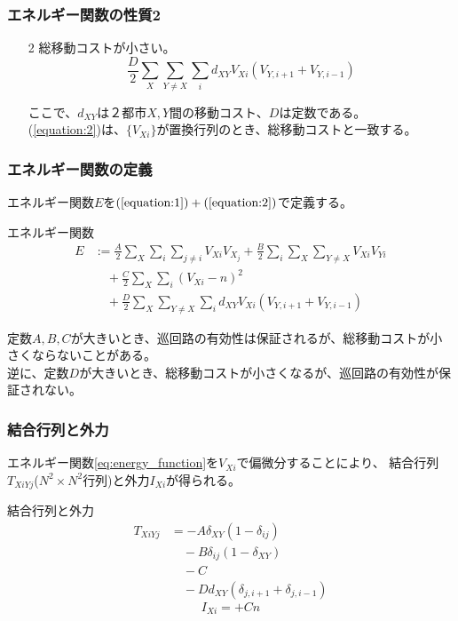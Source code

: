 \documentclass[dvipdfmx,11pt,notheorems]{beamer}
\theoremstyle{definition}
\begin{document}
\begin{frame}\frametitle{エネルギー関数の性質2}
\begin{enumerate}
\item[2] 総移動コストが小さい。 \\
\begin{equation}
	\label{equation:2}
	\displaystyle \frac{D}{2} \sum_{X}\sum_{Y \neq X}\sum_{i} d_{XY}V_{Xi}(V_{Y, i+1} + V_{Y, i-1})
\end{equation}

\vspace{1cm}
ここで、$d_{XY}$は２都市$X, Y$間の移動コスト、$D$は定数である。 \\
\vspace{1.0cm}
(\ref{equation:2})は、$\{V_{Xi}\}$が置換行列のとき、総移動コストと一致する。
\end{enumerate}
\end{frame}

\begin{frame}\frametitle{エネルギー関数の定義}
エネルギー関数$E$を$(\ref{equation:1}) + (\ref{equation:2})$で定義する。
\begin{block}{エネルギー関数}
\begin{equation}
\label{eq:energy_function}
\begin{split}
	E &:= 	\displaystyle \frac{A}{2}\sum_{X}\sum_{i}\sum_{j \neq i} V_{Xi}V_{X_{j}}
    + \frac{B}{2}\sum_{i}\sum_{X}\sum_{Y \neq X} V_{Xi}V_{Yi} \\
    & \quad + \frac{C}{2}\sum_{X}\sum_{i}(V_{Xi} - n)^2 \\
    & \quad + \frac{D}{2} \sum_{X}\sum_{Y \neq X}\sum_{i} d_{XY}V_{Xi}(V_{Y, i+1} + V_{Y, i-1})
\end{split}
\end{equation}
\end{block}
\vspace{1cm}
定数$A, B, C$が大きいとき、巡回路の有効性は保証されるが、総移動コストが小さくならないことがある。\\
逆に、定数$D$が大きいとき、総移動コストが小さくなるが、巡回路の有効性が保証されない。
\end{frame}

\begin{frame}\frametitle{結合行列と外力}
エネルギー関数\eqref{eq:energy_function}を$V_{Xi}$で偏微分することにより、 結合行列$T_{XiYj}$($N^2 \times N^2$行列)と外力$I_{Xi}$が得られる。
\begin{block}{結合行列と外力}
\begin{equation}
\begin{split}
T_{XiYj} &= -A\delta_{XY}(1 - \delta_{ij}) \\
			& \quad -B\delta_{ij}(1 - \delta_{XY}) \\
            & \quad - C \\
            & \quad -Dd_{XY}(\delta_{j, i+1} + \delta_{j, i-1})
\end{split}
\end{equation}
\begin{equation}
I_{Xi} = +Cn
\end{equation}
\end{block}
\end{frame}
\end{document}
